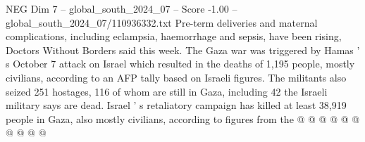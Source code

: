 \begin{textsample}{NEG Dim 7 – global\_south\_2024\_07 – Score -1.00 – global\_south\_2024\_07/110936332.txt}
Pre-term deliveries and maternal complications, including eclampsia, haemorrhage and sepsis, have been rising, Doctors Without Borders said this week.
The Gaza war was triggered by Hamas ' s October 7 attack on Israel which resulted in the deaths of 1,195 people, mostly civilians, according to an AFP tally based on Israeli figures.
The militants also seized 251 hostages, 116 of whom are still in Gaza, including 42 the Israeli military says are dead.
Israel ' s retaliatory campaign has killed at least 38,919 people in Gaza, also mostly civilians, according to figures from the @ @ @ @ @ @ @ @ @ @

\end{textsample}

